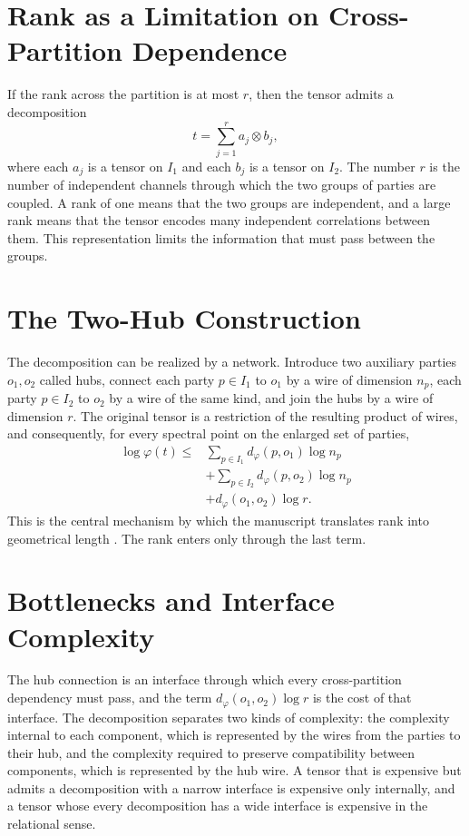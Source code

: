\documentclass[11pt,letterpaper]{report}
\theoremstyle{plain}
\theoremstyle{definition}
\theoremstyle{remark}
\begin{document}
\section{Rank as a Limitation on Cross-Partition Dependence}

If the rank across the partition is at most $r$, then the tensor admits a decomposition
\[
t=\sum_{j=1}^{r}a_j\otimes b_j,
\]
where each $a_j$ is a tensor on $I_1$ and each $b_j$ is a tensor on $I_2$. The number $r$ is the number of independent channels through which the two groups of parties are coupled. A rank of one means that the two groups are independent, and a large rank means that the tensor encodes many independent correlations between them. This representation limits the information that must pass between the groups.

\section{The Two-Hub Construction}

The decomposition can be realized by a network. Introduce two auxiliary parties $o_1,o_2$ called hubs, connect each party $p\in I_1$ to $o_1$ by a wire of dimension $n_p$, each party $p\in I_2$ to $o_2$ by a wire of the same kind, and join the hubs by a wire of dimension $r$. The original tensor is a restriction of the resulting product of wires, and consequently, for every spectral point on the enlarged set of parties,
\[
\begin{aligned}
\log\varphi(t)\le{}&\sum_{p\in I_1}d_\varphi(p,o_1)\log n_p\\
&+\sum_{p\in I_2}d_\varphi(p,o_2)\log n_p\\
&+d_\varphi(o_1,o_2)\log r.
\end{aligned}
\]
This is the central mechanism by which the manuscript translates rank into geometrical length \cite{Source2026}. The rank enters only through the last term.

\section{Bottlenecks and Interface Complexity}

The hub connection is an interface through which every cross-partition dependency must pass, and the term $d_\varphi(o_1,o_2)\log r$ is the cost of that interface. The decomposition separates two kinds of complexity: the complexity internal to each component, which is represented by the wires from the parties to their hub, and the complexity required to preserve compatibility between components, which is represented by the hub wire. A tensor that is expensive but admits a decomposition with a narrow interface is expensive only internally, and a tensor whose every decomposition has a wide interface is expensive in the relational sense.
\end{document}
